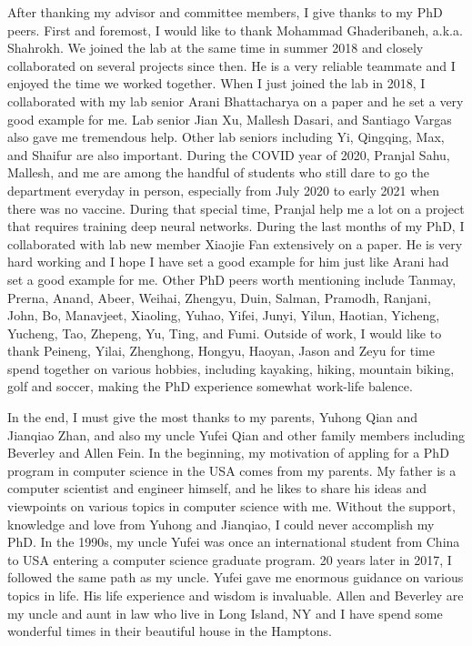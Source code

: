 After thanking my advisor and committee members, I give thanks to my PhD peers. First and foremost, I would like to thank Mohammad Ghaderibaneh, a.k.a. Shahrokh.
We joined the lab at the same time in summer 2018 and closely collaborated on several projects since then. 
He is a very reliable teammate and I enjoyed the time we worked together.
When I just joined the lab in 2018, I collaborated with my lab senior Arani Bhattacharya on a paper and he set a very good example for me. 
Lab senior Jian Xu, Mallesh Dasari, and Santiago Vargas also gave me tremendous help. Other lab seniors including Yi, Qingqing, Max, and Shaifur are also important.
During the COVID year of 2020, Pranjal Sahu, Mallesh, and me are among the handful of students who still dare to go the department everyday in person, 
especially from July 2020 to early 2021 when there was no vaccine.
During that special time, Pranjal help me a lot on a project that requires training deep neural networks.
During the last months of my PhD, I collaborated with lab new member Xiaojie Fan extensively on a paper.
He is very hard working and I hope I have set a good example for him just like Arani had set a good example for me.
Other PhD peers worth mentioning include Tanmay, Prerna, Anand, Abeer, Weihai, Zhengyu, Duin, Salman, Pramodh, Ranjani, John, Bo, Manavjeet, Xiaoling, Yuhao, Yifei, Junyi, Yilun, Haotian, Yicheng, Yucheng, Tao, Zhepeng, Yu, Ting, and Fumi.
Outside of work, I would like to thank Peineng, Yilai, Zhenghong, Hongyu, Haoyan, Jason and Zeyu for time spend together on various hobbies, including kayaking, hiking, mountain biking, golf and soccer, making the PhD experience somewhat work-life balence.

In the end, I must give the most thanks to my parents, Yuhong Qian and Jianqiao Zhan, and also my uncle Yufei Qian 
and other family members including Beverley and Allen Fein.
In the beginning, my motivation of appling for a PhD program in computer science in the USA comes from my parents.
My father is a computer scientist and engineer himself, and he likes to share his ideas and viewpoints on various topics in computer science with me.
Without the support, knowledge and love from Yuhong and Jianqiao, I could never accomplish my PhD.
In the 1990s, my uncle Yufei was once an international student from China to USA entering a computer science graduate program.
20 years later in 2017, I followed the same path as my uncle. 
Yufei gave me enormous guidance on various topics in life. His life experience and wisdom is invaluable.
Allen and Beverley are my uncle and aunt in law who live in Long Island, NY and I have spend some wonderful times in their beautiful house in the Hamptons.
